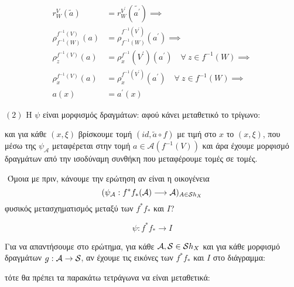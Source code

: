 \begin{align*}
r^V_W (\tilde{a}) &= r^{V^{\prime}}_W (\tilde{a^{\prime}}) \implies \\
\rho^{f^{-1}(V)}_{f^{-1}(W)} (a) &= \rho^{f^{-1}(V^{\prime})}_{f^{-1}(W)} (a^{\prime}) \implies \\
\rho^{f^{-1}(V)}_z (a) &= \rho^{f^{-1}}_x (V^{\prime})(a^{\prime}) \quad \forall \ z \in f^{-1}(W) \implies \\
\rho^{f^{-1}(V)}_x (a) &= \rho^{f^{-1}(V^{\prime})}_x (a^{\prime}) \quad \forall \ z \in f^{-1}(W) \implies \\
a(x) &= a^{\prime}(x)
\end{align*}


\noindent $(2)$ Η $\psi$ είναι μορφισμός δραγμάτων:
αφού κάνει μεταθετικό το τρίγωνο:


\begin{figure}[H]
    \centering
\end{figure}



\noindent και για κάθε $(x,\xi)$ βρίσκουμε τομή $(id, \tilde{a} \circ f)$ με τιμή στο $x$ το $(x,\xi)$, που μέσω της $\psi_{\mathcal{A}}$ μεταφέρεται στην τομή $a \in \mathcal{A}(f^{-1}(V))$ και άρα έχουμε μορφισμό δραγμάτων από την ισοδύναμη συνθήκη που μεταφέρουμε τομές σε τομές.

$ $\newline
Όμοια με πριν, κάνουμε την ερώτηση αν είναι η οικογένεια
$$(\psi_{\mathcal{A}}: f^*f_* (\mathcal{A}) \longrightarrow \mathcal{A})_{A \in \mathcal{S} h_X}$$ φυσικός μετασχηματισμός μεταξύ των $f^*f_*$ και $I$?

$$\psi: f^*f_* \longrightarrow I$$

\noindent Για να απαντήσουμε στο ερώτημα, για κάθε $\mathcal{A},\mathcal{S} \in \mathcal{S} h_X$ και για κάθε μορφισμό δραγμάτων $g:\mathcal{A}\rightarrow \mathcal{S}$, αν έχουμε τις εικόνες των $f^*f_*$ και $I$ στο διάγραμμα:

\begin{figure}[H]
    \centering
\end{figure}
\noindent τότε θα πρέπει τα παρακάτω τετράγωνα να είναι μεταθετικά:

